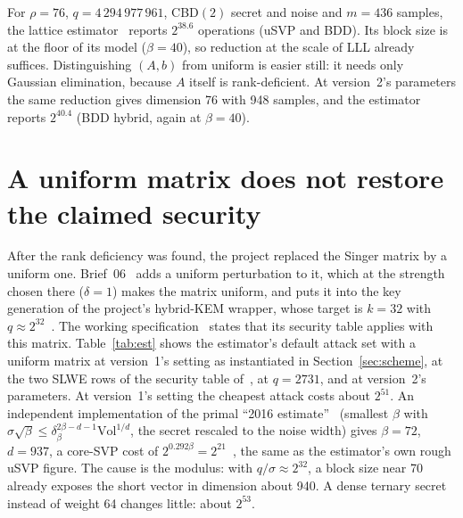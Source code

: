 \documentclass[11pt]{article}
\theoremstyle{remark}
\begin{document}
For $\rho=76$, $q=4\,294\,977\,961$, CBD$(2)$ secret and noise and $m=436$ samples, the lattice
estimator~\cite{APS15,estimator} reports $2^{38.6}$ operations (uSVP and BDD). Its block size is at the floor of its
model ($\beta=40$), so reduction at the scale of LLL already suffices. Distinguishing $(A,b)$ from uniform is easier
still: it needs only Gaussian elimination, because $A$ itself is rank-deficient. At version~2's parameters the same
reduction gives dimension 76 with 948 samples, and the estimator reports $2^{40.4}$ (BDD hybrid, again at $\beta=40$).

\section{A uniform matrix does not restore the claimed security}\label{sec:uniform}

After the rank deficiency was found, the project replaced the Singer matrix by a uniform one. Brief~06~\cite{Brief06}
adds a uniform perturbation to it, which at the strength chosen there ($\delta=1$) makes the matrix uniform, and puts it
into the key generation of the project's hybrid-KEM wrapper, whose target is $k=32$ with $q\approx2^{32}$~\cite{KEM}.
The working specification~\cite{Gif26b} states that its security table applies with this matrix. Table~\ref{tab:est}
shows the estimator's default attack set with a uniform matrix at version~1's setting as instantiated in
Section~\ref{sec:scheme}, at the two SLWE rows of the security table of~\cite{Gif26b}, at $q=2731$, and at version~2's
parameters. At version~1's setting the cheapest attack costs about $2^{51}$. An
independent implementation of the primal ``2016 estimate''~\cite{ADPS16} (smallest $\beta$ with
$\sigma\sqrt\beta\le\delta_\beta^{2\beta-d-1}\mathrm{Vol}^{1/d}$, the secret rescaled to the noise width) gives $\beta=72$,
$d=937$, a core-SVP cost of $2^{0.292\beta}=2^{21}$~\cite{BDGL16}, the same as the estimator's own rough uSVP figure.
The cause is the modulus: with $q/\sigma\approx2^{32}$, a block size near 70 already exposes the short vector in
dimension about 940. A dense ternary secret instead of weight 64 changes little: about $2^{53}$.
\end{document}
